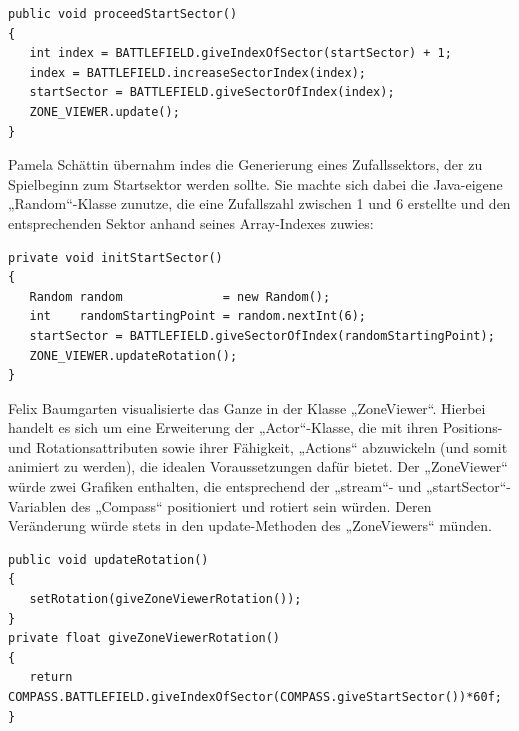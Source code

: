 \begin{lstlisting}
public void proceedStartSector()
{
   int index = BATTLEFIELD.giveIndexOfSector(startSector) + 1;
   index = BATTLEFIELD.increaseSectorIndex(index);
   startSector = BATTLEFIELD.giveSectorOfIndex(index);
   ZONE_VIEWER.update();
}
\end{lstlisting}

Pamela Schättin übernahm indes die Generierung eines Zufallssektors, der zu Spielbeginn zum Startsektor werden sollte. Sie machte sich dabei die Java-eigene „Random“-Klasse zunutze, die eine Zufallszahl zwischen 1 und 6 erstellte und den entsprechenden Sektor anhand seines Array-Indexes zuwies:

\begin{lstlisting}
private void initStartSector()
{
   Random random              = new Random();
   int    randomStartingPoint = random.nextInt(6);
   startSector = BATTLEFIELD.giveSectorOfIndex(randomStartingPoint);
   ZONE_VIEWER.updateRotation();
}
\end{lstlisting}

Felix Baumgarten visualisierte das Ganze in der Klasse „ZoneViewer“. Hierbei handelt es sich um eine Erweiterung der „Actor“-Klasse, die mit ihren Positions- und Rotationsattributen sowie ihrer Fähigkeit, „Actions“ abzuwickeln (und somit animiert zu werden), die idealen Voraussetzungen dafür bietet. Der „ZoneViewer“ würde zwei Grafiken enthalten, die entsprechend der „stream“- und „startSector“-Variablen des „Compass“ positioniert und rotiert sein würden. Deren Veränderung würde stets in den update-Methoden des „ZoneViewers“ münden.

\begin{lstlisting}[basicstyle=\tiny]
public void updateRotation()
{
   setRotation(giveZoneViewerRotation());
}
private float giveZoneViewerRotation()
{
   return COMPASS.BATTLEFIELD.giveIndexOfSector(COMPASS.giveStartSector())*60f;
}
\end{lstlisting}

